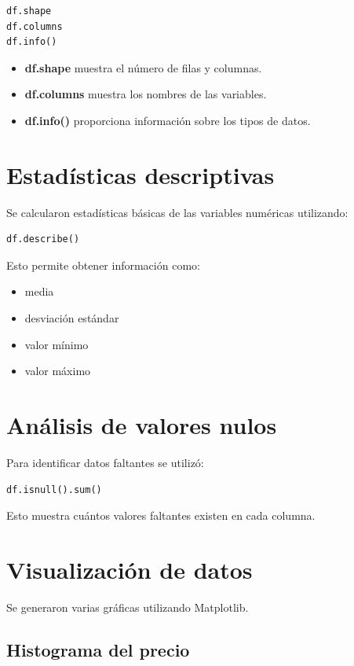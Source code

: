 \documentclass{article}
\begin{document}
\begin{lstlisting}
df.shape
df.columns
df.info()
\end{lstlisting}

\begin{itemize}
\item \textbf{df.shape} muestra el número de filas y columnas.
\item \textbf{df.columns} muestra los nombres de las variables.
\item \textbf{df.info()} proporciona información sobre los tipos de datos.
\end{itemize}

\section{Estadísticas descriptivas}

Se calcularon estadísticas básicas de las variables numéricas utilizando:

\begin{lstlisting}
df.describe()
\end{lstlisting}

Esto permite obtener información como:

\begin{itemize}
\item media
\item desviación estándar
\item valor mínimo
\item valor máximo
\end{itemize}

\section{Análisis de valores nulos}

Para identificar datos faltantes se utilizó:

\begin{lstlisting}
df.isnull().sum()
\end{lstlisting}

Esto muestra cuántos valores faltantes existen en cada columna.

\section{Visualización de datos}

Se generaron varias gráficas utilizando Matplotlib.

\subsection{Histograma del precio}
\end{document}
